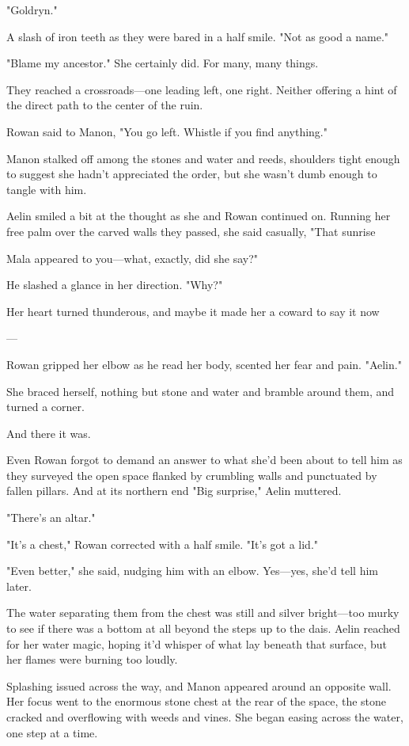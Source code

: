 "Goldryn."

A slash of iron teeth as they were bared in a half smile. "Not as good a name."

"Blame my ancestor." She certainly did. For many, many things.

They reached a crossroads---one leading left, one right. Neither offering a hint of the direct path to the center of the ruin.

Rowan said to Manon, "You go left. Whistle if you find anything."

Manon stalked off among the stones and water and reeds, shoulders tight enough to suggest she hadn't appreciated the order, but she wasn't dumb enough to tangle with him.

Aelin smiled a bit at the thought as she and Rowan continued on. Running her free palm over the carved walls they passed, she said casually, "That sunrise

Mala appeared to you---what, exactly, did she say?"

He slashed a glance in her direction. "Why?"

Her heart turned thunderous, and maybe it made her a coward to say it now

---

Rowan gripped her elbow as he read her body, scented her fear and pain. "Aelin."

She braced herself, nothing but stone and water and bramble around them, and turned a corner.

And there it was.

Even Rowan forgot to demand an answer to what she'd been about to tell him as they surveyed the open space flanked by crumbling walls and punctuated by fallen pillars. And at its northern end  "Big surprise," Aelin muttered.

"There's an altar."

"It's a chest," Rowan corrected with a half smile. "It's got a lid."

"Even better," she said, nudging him with an elbow. Yes---yes, she'd tell him later.

The water separating them from the chest was still and silver bright---too murky to see if there was a bottom at all beyond the steps up to the dais. Aelin reached for her water magic, hoping it'd whisper of what lay beneath that surface, but her flames were burning too loudly.

Splashing issued across the way, and Manon appeared around an opposite wall. Her focus went to the enormous stone chest at the rear of the space, the stone cracked and overflowing with weeds and vines. She began easing across the water, one step at a time.

